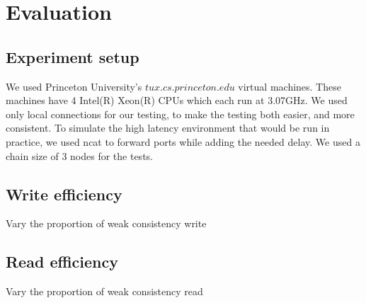 \section{Evaluation}
\label{sec:eval}

\subsection{Experiment setup}
We used Princeton University's $tux.cs.princeton.edu$ virtual machines.
These machines have 4 Intel(R) Xeon(R) CPUs which each run at 3.07GHz.
We used only local connections for our testing, to make the testing both easier, and more consistent.
To simulate the high latency environment that would be run in practice,
we used ncat to forward ports while adding the needed delay.
We used a chain size of 3 nodes for the tests.


\subsection{Write efficiency}
Vary the proportion of weak consistency write



\subsection{Read efficiency}
Vary the proportion of weak consistency read



